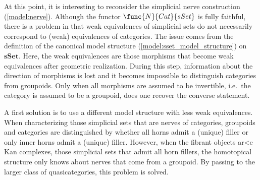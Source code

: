     At this point, it is interesting to reconsider the simplicial nerve construction (\cref{model:nerve}). Although the functor $\func{N}{Cat}{sSet}$ is fully faithful, there is a problem in that weak equivalences of simplicial sets do not necessarily correspond to (weak) equivalences of categories. The issue comes from the definition of the canonical model structure (\cref{model:sset_model_structure}) on $\mathbf{sSet}$. Here, the weak equivalences are those morphisms that become weak equivalences after geometric realization. During this step, information about the direction of morphisms is lost and it becomes impossible to distinguish categories from groupoids. Only when all morphisms are assumed to be invertible, i.e.~the category is assumed to be a groupoid, does one recover the converse statement.

    A first solution is to use a different model structure with less weak equivalences.
    When characterizing those simplicial sets that are nerves of categories, groupoids and categories are distinguished by whether all horns admit a (unique) filler or only inner horns admit a (unique) filler. However, when the fibrant objects ar<e Kan complexes, those simplicial sets that admit all horn fillers, the homotopical structure only knows about nerves that come from a groupoid. By passing to the larger class of quasicategories, this problem is solved.

